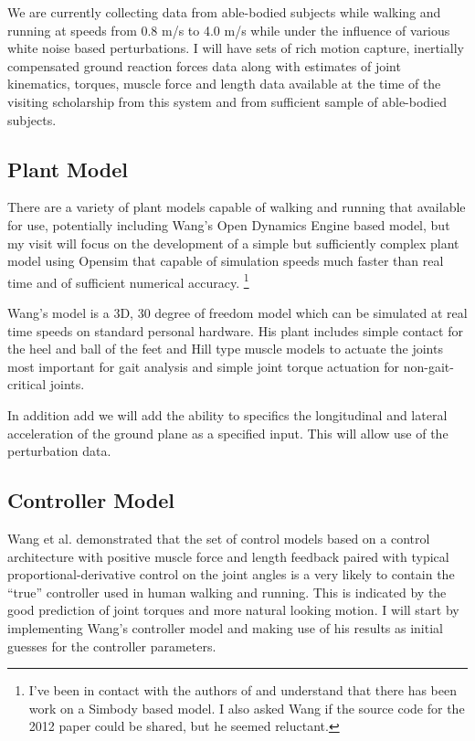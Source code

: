 \documentclass[11pt]{article}
\begin{document}

We are currently collecting data from able-bodied subjects while walking and
running at speeds from 0.8 m/s to 4.0 m/s while under the influence of various
white noise based perturbations. I will have sets of rich motion capture,
inertially compensated ground reaction forces data along with estimates of
joint kinematics, torques, muscle force and length data available at the time
of the visiting scholarship from this system and from sufficient sample of
able-bodied subjects.

\subsection*{Plant Model}

There are a variety of plant models capable of walking and running that
available for use, potentially including Wang's Open Dynamics Engine based
model, but my visit will focus on the development of a simple but sufficiently
complex plant model using Opensim that capable of simulation speeds much faster
than real time and of sufficient numerical accuracy. \footnote{I've been in
  contact with the authors of \cite{Wang2012} and understand that there has
been work on a Simbody based model. I also asked Wang if the source code for the
2012 paper could be shared, but he seemed reluctant.}

Wang's model is a 3D, 30 degree of freedom model which can be simulated at real
time speeds on standard personal hardware. His plant includes simple contact
for the heel and ball of the feet and Hill type muscle models to actuate the
joints most important for gait analysis and simple joint torque actuation for
non-gait-critical joints.

In addition add we will add the ability to specifics the longitudinal and
lateral acceleration of the ground plane as a specified input. This will allow
use of the perturbation data.

\subsection*{Controller Model}

Wang et al. demonstrated that the set of control models based on a control
architecture with positive muscle force and length feedback paired with typical
proportional-derivative control on the joint angles is a very likely to contain
the ``true'' controller used in human walking and running. This is indicated by
the good prediction of joint torques and more natural looking motion. I will
start by implementing Wang's controller model and making use of his results as
initial guesses for the controller parameters.
\end{document}
